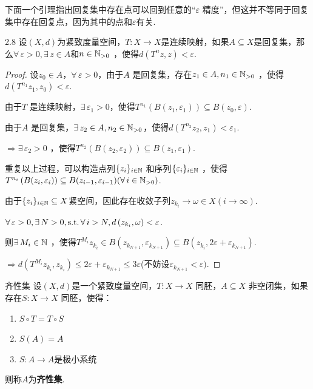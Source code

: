 下面一个引理指出回复集中存在点可以回到任意的“$\varepsilon$ 精度”，但这并不等同于回复集中存在回复点，因为其中的点和$\varepsilon$有关.\par 
\begin{lemma}{}{2.8}
    设$(X,d)$为紧致度量空间，$T:X\to X$是连续映射，如果$A\subseteq X$是回复集，那么$\forall\, \varepsilon>0,\exists\, z\in A$和$n\in\mathbb{N}_{>0}$ ，使得$d \left(T^{n}z,z\right)<\varepsilon$.
\end{lemma}
\begin{proof}
    设$z_0\in A$，$\forall\, \varepsilon>0$，由于$A$ 是回复集，存在$z_1\in A,n_1\in\mathbb{N}_{>0}$ ，使得$d \left(T^{n_1}z_1,z_0\right)<\varepsilon$.\par
    由于$T$ 是连续映射，$\exists\, \varepsilon_1>0$，使得$T^{n_1}\left(B(z_1,\varepsilon_1)\right)\subseteq B(z_0,\varepsilon)$.\par
    由于$A$ 是回复集，$\exists\, z_2\in A,n_2\in\mathbb{N}_{>0}$，使得$d \left(T^{n_2}z_2,z_1\right)<\varepsilon_1$.\par
    $\Rightarrow \exists\, \varepsilon_2>0$ ，使得$T^{n_2}\left(B(z_2,\varepsilon_2)\right)\subseteq B(z_1,\varepsilon_1)$.\par
    重复以上过程，可以构造点列$\{z_i\}_{i\in\mathbb{N}}$ 和序列$\{\varepsilon_i\}_{i\in\mathbb{N}}$ ，使得$T^{n_i}\left(B(z_i,\varepsilon_i)\right)\subseteq B(z_{i-1},\varepsilon_{i-1})(\forall\, i\in\mathbb{N}_{>0})$.\par
    由于$\{z_i\}_{i\in\mathbb{N}}\subseteq X$紧空间，因此存在收敛子列$z_{k_i}\to\omega\in X(i\to\infty)$.\par
    $\forall\,\varepsilon>0,\exists\, N>0,\operatorname{\text{s.t.}}\forall\, i>N,d \left(z_{k_i},\omega\right)<\varepsilon$.\par
    则$\exists\, M_i\in\mathbb{N}$ ，使得$T^{M_i}{z_{k_i}}\in B \left(z_{k_{N+1}},\varepsilon_{k_{N+1}}\right)\subseteq B \left(z_{k_i},2\varepsilon+\varepsilon_{k_{N+1}}\right)$.\par
    $\Rightarrow d \left(T^{M_i}z_{k_i},z_{k_i}\right)\leq 2\varepsilon+\varepsilon_{k_{N+1}}\leq 3\varepsilon$(不妨设$\varepsilon_{k_{N+1}}<\varepsilon)$.\par
\end{proof}

\begin{definition}{齐性集}
    设$(X,d)$是一个紧致度量空间，$T:X\to X$ 同胚，$A\subseteq X$ 非空闭集，如果存在$S:X\to X$ 同胚，使得：
    \begin{enumerate}[(1)]
        \item $S\circ T=T\circ S$
        \item $S(A)=A$
        \item $S:A\to A$是极小系统
    \end{enumerate}
    则称$A$为\textbf{齐性集}.
\end{definition}

